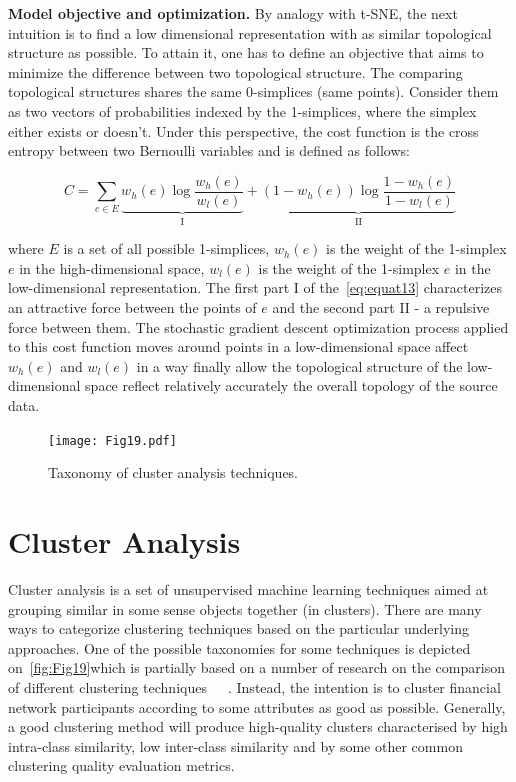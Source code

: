 \textbf{Model objective and optimization. }
By analogy with t-SNE, the next intuition is to find a low dimensional representation with as similar topological structure as possible. To attain it, one has to define an objective that aims to minimize the difference between two topological structure. The comparing topological structures shares the same 0-simplices (same points). Consider them as two vectors of probabilities indexed by the 1-simplices, where the simplex either exists or doesn’t. Under this perspective, the cost function is the cross entropy between two Bernoulli variables and is defined as follows:

\begin{equation}
  C = \sum_{e\in E} \underbrace{w_h(e)\log \frac{w_h(e)}{w_l(e)}}_\text{I} + \underbrace{(1-w_h(e))\log \frac{1-w_h(e)}{1-w_l(e)}}_\text{II}
  \label{eq:equat13}
\end{equation}

where $E$ is a set of all possible 1-simplices, $w_h(e)$ is the weight of the 1-simplex $e$ in the high-dimensional space, $w_l(e)$ is the weight of the 1-simplex $e$ in the low-dimensional representation. The first part I of the~\autoref{eq:equat13} characterizes an attractive force between the points of $e$ and the second part II - a repulsive force between them. The stochastic gradient descent optimization process applied to this cost function moves around points in a low-dimensional space affect $w_h(e)$ and $w_l(e)$ in a way finally allow the topological structure of the low-dimensional space reflect relatively accurately the overall topology of the source data.

\begin{figure}[H]
    \centering
    \texttt{[image: Fig19.pdf]}
    \caption{Taxonomy of cluster analysis techniques.}
    \label{fig:Fig19}
\end{figure}

\section{Cluster Analysis}
\label{Cluster Analysis}
Cluster analysis is a set of unsupervised machine learning techniques aimed at grouping similar in some sense objects together (in clusters). There are many ways to categorize clustering techniques based on the particular underlying approaches. One of the possible taxonomies for some techniques is depicted on~\autoref{fig:Fig19}which is partially based on a number of research on the comparison of different clustering techniques~\cite{steinbach2004challenges}~\cite{karypis2000comparison}~\cite{DBSCANvsK-Means}. Instead, the intention is to cluster financial network participants according to some attributes as good as possible. Generally, a good clustering method will produce high-quality clusters characterised by high intra-class similarity, low inter-class similarity and by some other common clustering quality evaluation metrics.

